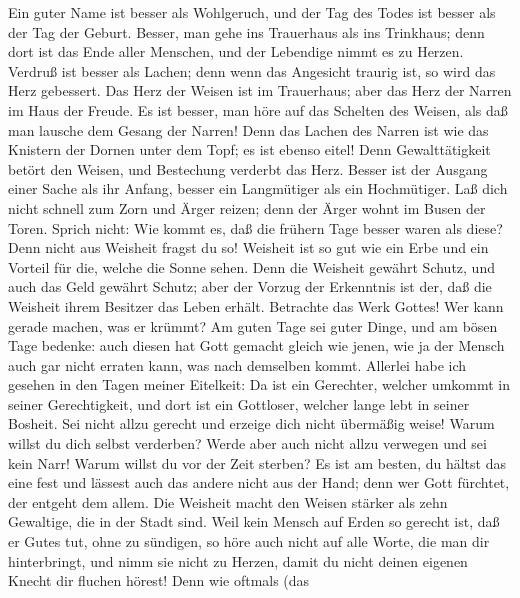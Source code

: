  Ein guter Name ist besser als Wohlgeruch, und der Tag des
Todes ist besser als der Tag der Geburt.  Besser, man gehe
ins Trauerhaus als ins Trinkhaus; denn dort ist das Ende aller Menschen,
und der Lebendige nimmt es zu Herzen.  Verdruß ist besser
als Lachen; denn wenn das Angesicht traurig ist, so wird das Herz
gebessert.  Das Herz der Weisen ist im Trauerhaus; aber
das Herz der Narren im Haus der Freude.  Es ist besser,
man höre auf das Schelten des Weisen, als daß man lausche dem Gesang der
Narren!  Denn das Lachen des Narren ist wie das Knistern
der Dornen unter dem Topf; es ist ebenso eitel!  Denn
Gewalttätigkeit betört den Weisen, und Bestechung verderbt das Herz.
 Besser ist der Ausgang einer Sache als ihr Anfang, besser
ein Langmütiger als ein Hochmütiger.  Laß dich nicht
schnell zum Zorn und Ärger reizen; denn der Ärger wohnt im Busen der
Toren.  Sprich nicht: Wie kommt es, daß die frühern Tage
besser waren als diese? Denn nicht aus Weisheit fragst du so!
 Weisheit ist so gut wie ein Erbe und ein Vorteil für
die, welche die Sonne sehen.  Denn die Weisheit gewährt
Schutz, und auch das Geld gewährt Schutz; aber der Vorzug der Erkenntnis
ist der, daß die Weisheit ihrem Besitzer das Leben erhält.
 Betrachte das Werk Gottes! Wer kann gerade machen, was
er krümmt?  Am guten Tage sei guter Dinge, und am bösen
Tage bedenke: auch diesen hat Gott gemacht gleich wie jenen, wie ja der
Mensch auch gar nicht erraten kann, was nach demselben kommt.
 Allerlei habe ich gesehen in den Tagen meiner Eitelkeit:
Da ist ein Gerechter, welcher umkommt in seiner Gerechtigkeit, und dort
ist ein Gottloser, welcher lange lebt in seiner Bosheit. 
Sei nicht allzu gerecht und erzeige dich nicht übermäßig weise! Warum
willst du dich selbst verderben?  Werde aber auch nicht
allzu verwegen und sei kein Narr! Warum willst du vor der Zeit sterben?
 Es ist am besten, du hältst das eine fest und lässest
auch das andere nicht aus der Hand; denn wer Gott fürchtet, der entgeht
dem allem.  Die Weisheit macht den Weisen stärker als
zehn Gewaltige, die in der Stadt sind.  Weil kein Mensch
auf Erden so gerecht ist, daß er Gutes tut, ohne zu sündigen,
 so höre auch nicht auf alle Worte, die man dir
hinterbringt, und nimm sie nicht zu Herzen, damit du nicht deinen
eigenen Knecht dir fluchen hörest!  Denn wie oftmals (das
